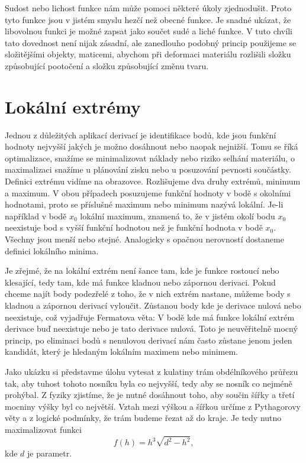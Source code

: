 \documentclass[12pt]{article}
\begin{document}
Sudost nebo lichost funkce nám může pomoci některé úkoly zjednodušit. Proto tyto funkce jsou v jistém smyslu hezčí než obecné funkce. Je snadné ukázat, že libovolnou funkci je možné zapsat jako součet sudé a liché funkce. V tuto chvíli tato dovednost není nijak zásadní, ale zanedlouho podobný princip použijeme se složitějšími objekty, maticemi, abychom při deformaci materiálu rozlišili složku způsobující pootočení a složku způsobující změnu tvaru.

\section*{Lokální extrémy}

Jednou z důležitých aplikací derivací je identifikace bodů, kde jsou funkční hodnoty nejvyšší jakých je možno dosáhnout nebo naopak nejnižší. Tomu se říká optimalizace, snažíme se minimalizovat náklady nebo riziko selhání materiálu, o maximalizaci snažíme u plánování zisku nebo u posuzování pevnosti součástky. Definici extrému vidíme na obrazovce. Rozlišujeme dva druhy extrémů, minimum a maximum. V obou případech posuzujeme funkční hodnoty v bodě s okolními hodnotami, proto se příslušné maximum nebo minimum nazývá lokální. Je-li například v bodě $x_0$ lokální maximum, znamená to, že v jistém okolí bodu $x_0$ neexistuje bod s vyšší funkční hodnotou než je funkční hodnota v bodě $x_0$. Všechny jsou menší nebo stejné. Analogicky s opačnou nerovností dostaneme definici lokálního minima.

Je zřejmé, že na lokální extrém není šance tam, kde je funkce rostoucí nebo klesající, tedy tam, kde má funkce kladnou nebo zápornou derivaci. Pokud chceme najít body podezřelé z toho, že v nich extrém nastane, můžeme body s kladnou a zápornou derivací vyloučit. Zůstanou body kde je derivace nulová nebo neexistuje, což vyjadřuje Fermatova věta: V bodě kde má funkce lokální extrém derivace buď neexistuje nebo je tato derivace nulová. Toto je neuvěřitelně mocný princip, po eliminaci bodů s nenulovou derivací nám často zůstane jenom jeden kandidát, který je hledaným lokálním maximem nebo minimem.

Jako ukázku si představme úlohu vytesat z kulatiny trám obdélníkového průřezu tak, aby tuhost tohoto nosníku byla co nejvyšší, tedy aby se nosník co nejméně prohýbal. Z fyziky zjistíme, že je nutné dosáhnout toho, aby součin šířky a třetí mocniny výšky byl co největší. Vztah mezi výškou a šířkou určíme z Pythagorovy věty a z logické podmínky, že trám budeme řezat až do kraje. Je tedy nutno maximalizovat funkci
$$f(h)=h^3\sqrt{d^2-h^2},$$
kde $d$ je parametr.
\end{document}

